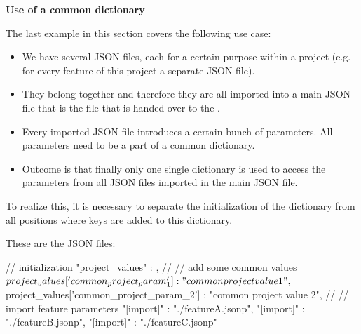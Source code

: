 \vspace{2ex}

\textbf{Use of a common dictionary}

\vspace{2ex}

The last example in this section covers the following use case:

\begin{itemize}
   \item We have several JSON files, each for a certain purpose within a project (e.g. for every feature of this project a separate JSON file).
   \item They belong together and therefore they are all imported into a main JSON file that is the file that is handed over to the \pkg.
   \item Every imported JSON file introduces a certain bunch of parameters. All parameters need to be a part of a common dictionary.
   \item Outcome is that finally only one single dictionary is used to access the parameters from all JSON files imported in the main JSON file.
\end{itemize}

To realize this, it is necessary to separate the initialization of the dictionary from all positions where keys are added to this dictionary.

These are the JSON files:

\vspace{2ex}

\textbullet {}

\begin{pythoncode}
{
   // initialization
   "project_values" : {},
   //
   // add some common values
   ${project_values}['common_project_param_1'] : "common project value 1",
   ${project_values}['common_project_param_2'] : "common project value 2",
   //
   // import feature parameters
   "[import]" : "./featureA.jsonp",
   "[import]" : "./featureB.jsonp",
   "[import]" : "./featureC.jsonp"
}
\end{pythoncode}

\newpage

\textbullet {}

